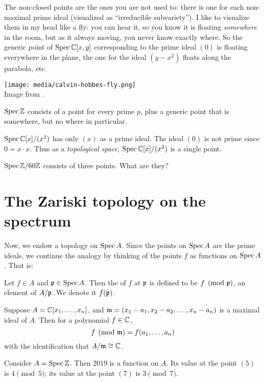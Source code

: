 The non-closed points are the ones you are not used to:
there is one for each non-maximal prime ideal
(visualized as ``irreducible subvariety'').
I like to visualize them in my head like a fly:
you can hear it, so you know it is floating \emph{somewhere} in the room,
but as it always moving, you never know exactly where.
So the generic point of $\operatorname{Spec} \mathbb C[x,y]$ corresponding to the prime
ideal $(0)$ is floating everywhere in the plane,
the one for the ideal $(y-x^2)$ floats along the parabola, etc.
\begin{center}
	\texttt{[image: media/calvin-hobbes-fly.png]} \\
	\footnotesize Image from \cite{img:calvin_hobbes_fly}.
\end{center}

\begin{example}
	\listhack
	\begin{enumerate}[(a)]
		\ii $\operatorname{Spec} \mathbb Z$ consists of a point for every prime $p$,
		plus a generic point that is somewhere, but no where in particular.

		\ii $\operatorname{Spec} \mathbb C[x] / (x^2)$ has only $(x)$ as a prime ideal.
		The ideal $(0)$ is not prime since $0 = x \cdot x$.
		Thus as a \emph{topological space},
		$\operatorname{Spec} \mathbb C[x] / (x^2)$ is a single point.

		\ii $\operatorname{Spec} \mathbb Z/60\mathbb Z$ consists of three points.
		What are they?
	\end{enumerate}
\end{example}

\section{The Zariski topology on the spectrum}

Now, we endow a topology on $\operatorname{Spec} A$.
Since the points on $\operatorname{Spec} A$ are the prime ideals, we continue
the analogy by thinking of the points $f$ as functions on $\operatorname{Spec} A$. That is:
\begin{definition}
	Let $f \in A$ and $\mathfrak p \in \operatorname{Spec} A$.
	Then the  of $f$ at $\mathfrak p$ is defined to be $f \pmod{\mathfrak p}$,
	an element of $A/\mathfrak p$.
	We denote it $f(\mathfrak p)$.
\end{definition}
\begin{example}
	Suppose $A = \mathbb C[x_1, \dots, x_n]$,
	and $\mathfrak m = (x_1-a_1, x_2-a_2, \dots, x_n-a_n)$ is a maximal ideal of $A$.
	Then for a polynomial $f \in \mathbb C$,
	\[ f \pmod {\mathfrak m} = f(a_1, \dots, a_n) \]
	with the identification that $A/\mathfrak m \cong \mathbb C$.
\end{example}
\begin{example}
	Consider $A = \operatorname{Spec} \mathbb Z$.
	Then $2019$ is a function on $A$.
	Its value at the point $(5)$ is $4 \pmod 5$;
	its value at the point $(7)$ is $3 \pmod 7$.
\end{example}

